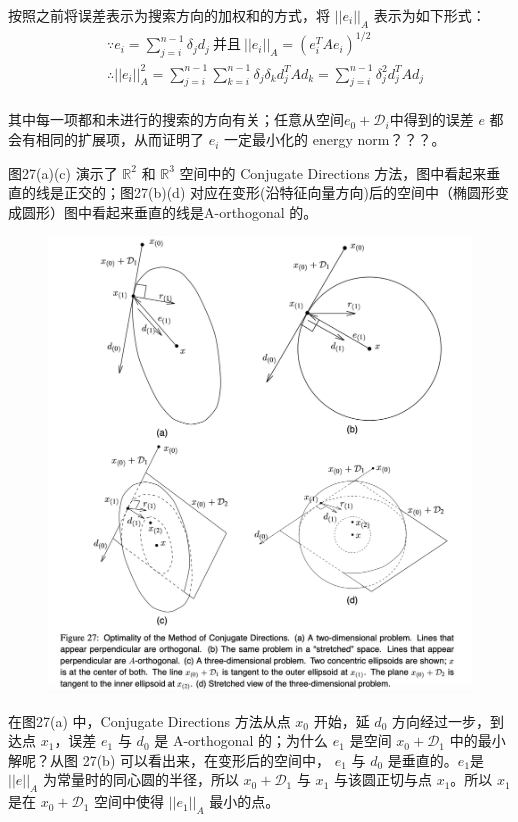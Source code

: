 \documentclass[12pt]{article}
\begin{document}
按照之前将误差表示为搜索方向的加权和的方式，将 $||e_i||_A$ 表示为如下形式：
\begin{align*}
& \because e_i = \sum_{j=i}^{n-1}\delta_jd_j  \  \text{并且} \ ||e_i||_A = (e_i^TAe_i)^{1/2} \\
&\therefore ||e_i||^2_A = \sum_{j=i}^{n-1}\sum_{k=i}^{n-1}\delta_j\delta_kd^T_jAd_k = \sum_{j=i}^{n-1}\delta_j^2d^T_jAd_j\\
\end{align*}

其中每一项都和未进行的搜索的方向有关；任意从空间$e_0 + \mathcal{D}_i$中得到的误差 $e$ 都会有相同的扩展项，从而证明了 $e_i$ 一定最小化的 energy norm？？？。

图27(a)(c) 演示了 $\mathbb{R}^2$ 和 $\mathbb{R}^3$ 空间中的 Conjugate Directions 方法，图中看起来垂直的线是正交的；图27(b)(d) 对应在变形(沿特征向量方向)后的空间中（椭圆形变成圆形）图中看起来垂直的线是A-orthogonal 的。
\begin{figure}[H]
    \centering
    \includegraphics[width=1\textwidth]{fig/CG_Convergence_CD_6.png}
\end{figure}

在图27(a) 中，Conjugate Directions 方法从点 $x_0$ 开始，延 $d_0$ 方向经过一步，到达点 $x_1$，误差 $e_1$ 与 $d_0$ 是 A-orthogonal 的；为什么 $e_1$ 是空间 $x_0 + \mathcal{D}_1$ 中的最小解呢？从图 27(b) 可以看出来，在变形后的空间中， $e_1$ 与 $d_0$ 是垂直的。$e_1$是 $||e||_A$ 为常量时的同心圆的半径，所以 $x_0 + \mathcal{D}_1$ 与 $x_1$ 与该圆正切与点 $x_1$。所以 $x_1$ 是在 $x_0 + \mathcal{D}_1$ 空间中使得 $||e_1||_A$ 最小的点。



\end{document}

